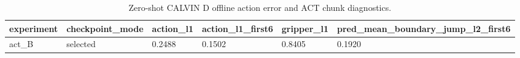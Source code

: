 \begin{table}[t]
\centering
\caption{Zero-shot CALVIN D offline action error and ACT chunk diagnostics.}
\label{tab:zero-shot-d-results}
\begin{tabular}{llllll}
\toprule
experiment & checkpoint\_mode & action\_l1 & action\_l1\_first6 & gripper\_l1 & pred\_mean\_boundary\_jump\_l2\_first6 \\
\midrule
act\_B & selected & 0.2488 & 0.1502 & 0.8405 & 0.1920 \\
\bottomrule
\end{tabular}
\end{table}
